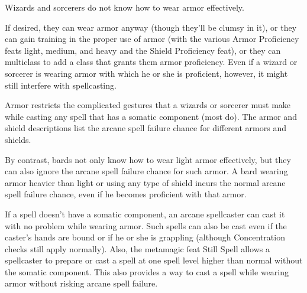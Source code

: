 \smallskip Wizards and sorcerers do not know how to wear armor effectively.

\smallskip If desired, they can wear armor anyway (though they'll be clumsy in it), or they can gain training in the proper use of armor (with the various Armor Proficiency feats light, medium, and heavy and the Shield Proficiency feat), or they can multiclass to add a class that grants them armor proficiency. Even if a wizard or sorcerer is wearing armor with which he or she is proficient, however, it might still interfere with spellcasting.

\smallskip Armor restricts the complicated gestures that a wizards or sorcerer must make while casting any spell that has a somatic component (most do). The armor and shield descriptions list the arcane spell failure chance for different armors and shields.

\smallskip By contrast, bards not only know how to wear light armor effectively, but they can also ignore the arcane spell failure chance for such armor. A bard wearing armor heavier than light or using any type of shield incurs the normal arcane spell failure chance, even if he becomes proficient with that armor.

\smallskip If a spell doesn't have a somatic component, an arcane spellcaster can cast it with no problem while wearing armor. Such spells can also be cast even if the caster's hands are bound or if he or she is grappling (although Concentration checks still apply normally). Also, the metamagic feat Still Spell allows a spellcaster to prepare or cast a spell at one spell level higher than normal without the somatic component. This also provides a way to cast a spell while wearing armor without risking arcane spell failure. 
